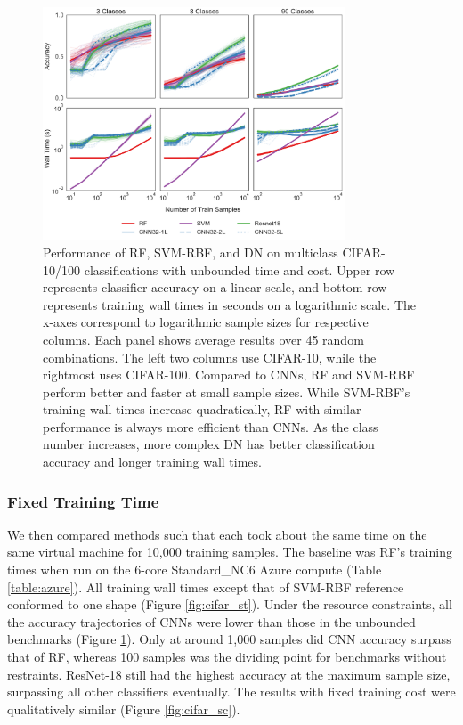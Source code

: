 \begin{figure}[!htb]
\centering
\includegraphics[width=0.8\textwidth]{figures/cifar.pdf}
  \caption{Performance of RF, SVM-RBF, and DN on multiclass CIFAR-10/100 classifications with unbounded time and cost.
  Upper row represents classifier accuracy on a linear scale, and bottom row represents training wall times in seconds on a logarithmic scale. The x-axes correspond to logarithmic sample sizes for respective columns. Each panel shows average results over 45 random combinations. The left two columns use CIFAR-10, while the rightmost uses CIFAR-100.
  Compared to CNNs, RF and SVM-RBF perform better and faster at small sample sizes. While SVM-RBF's training wall times increase quadratically, RF with similar performance is always more efficient than CNNs. As the class number increases, more complex DN has better classification accuracy and longer training wall times.
  }
\label{fig:cifar}
\end{figure}

\subsubsection{Fixed Training Time}
We then compared methods such that each took about the same time on the same virtual machine for 10,000 training samples. The baseline was RF's training times when run on the 6-core Standard\_NC6 Azure compute (Table \ref{table:azure}).
All training wall times except that of SVM-RBF reference conformed to one shape (Figure \ref{fig:cifar_st}). Under the resource constraints, all the accuracy trajectories of CNNs were lower than those in the unbounded benchmarks (Figure \ref{fig:cifar}). Only at around 1,000 samples did CNN accuracy surpass that of RF, whereas 100 samples was the dividing point for benchmarks without restraints. ResNet-18 still had the highest accuracy at the maximum sample size, surpassing all other classifiers eventually. The results with fixed training cost were qualitatively similar (Figure \ref{fig:cifar_sc}).

